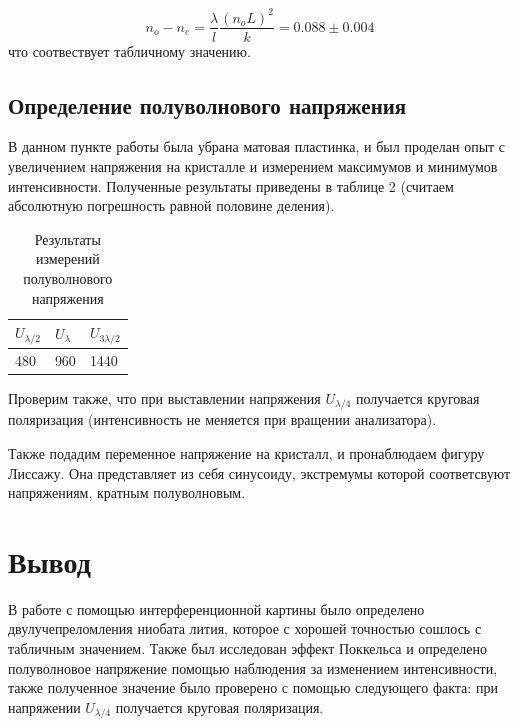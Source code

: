 \documentclass[12pt, a4paper]{article}
\begin{document}
$$n_{o}-n_{e} = \dfrac{\lambda}{l} \dfrac{(n_oL)^2}{k} = 0.088 \pm 0.004$$
что соотвествует табличному значению.

\subsection{Определение полуволнового напряжения}
В данном пункте работы была убрана матовая пластинка, и был проделан опыт с
увеличением напряжения на кристалле и измерением максимумов и минимумов
интенсивности. Полученные результаты приведены в таблице 2 (считаем абсолютную
погрешность равной половине деления).

\begin{table}[h]
    \begin{tabular}{|l|l|l|}
        \hline
        $U_{\lambda/2}$ & $U_{\lambda}$ & $U_{3\lambda/2}$ \\ \hline
        480             & 960           & 1440             \\ \hline
    \end{tabular}
    \caption{Результаты измерений полуволнового напряжения}
\end{table}

Проверим также, что при выставлении напряжения $U_{\lambda/4}$ получается
круговая поляризация (интенсивность не меняется при вращении анализатора).

Также подадим переменное напряжение на кристалл, и пронаблюдаем фигуру Лиссажу.
Она представляет из себя синусоиду, экстремумы которой соответсвуют
напряжениям, кратным полуволновым.

\section{Вывод}
В работе с помощью интерференционной картины было определено двулучепреломления
ниобата лития, которое с хорошей точностью сошлось с табличным значением. Также
был исследован эффект Поккельса и определено полуволновое напряжение помощью
наблюдения за изменением интенсивности, также полученное значение было
проверено с помощью следующего факта: при напряжении $U_{\lambda/4}$ получается
круговая поляризация.
\end{document}
